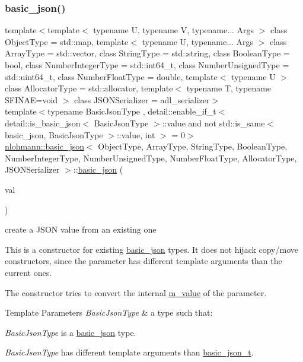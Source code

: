 \subsubsection{\texorpdfstring{basic\+\_\+json()}{basic\_json()}\hspace{0.1cm}{\footnotesize\ttfamily [4/9]}}
{\footnotesize\ttfamily template$<$template$<$ typename U, typename V, typename... Args $>$ class Object\+Type = std\+::map, template$<$ typename U, typename... Args $>$ class Array\+Type = std\+::vector, class String\+Type  = std\+::string, class Boolean\+Type  = bool, class Number\+Integer\+Type  = std\+::int64\+\_\+t, class Number\+Unsigned\+Type  = std\+::uint64\+\_\+t, class Number\+Float\+Type  = double, template$<$ typename U $>$ class Allocator\+Type = std\+::allocator, template$<$ typename T, typename S\+F\+I\+N\+A\+E=void $>$ class J\+S\+O\+N\+Serializer = adl\+\_\+serializer$>$ \\
template$<$typename Basic\+Json\+Type , detail\+::enable\+\_\+if\+\_\+t$<$ detail\+::is\+\_\+basic\+\_\+json$<$ Basic\+Json\+Type $>$\+::value and not std\+::is\+\_\+same$<$ basic\+\_\+json, Basic\+Json\+Type $>$\+::value, int $>$  = 0$>$ \\
\mbox{\hyperlink{classnlohmann_1_1basic__json}{nlohmann\+::basic\+\_\+json}}$<$ Object\+Type, Array\+Type, String\+Type, Boolean\+Type, Number\+Integer\+Type, Number\+Unsigned\+Type, Number\+Float\+Type, Allocator\+Type, J\+S\+O\+N\+Serializer $>$\+::\mbox{\hyperlink{classnlohmann_1_1basic__json}{basic\+\_\+json}} (\begin{DoxyParamCaption}\item[{const Basic\+Json\+Type \&}]{val }\end{DoxyParamCaption})\hspace{0.3cm}{\ttfamily [inline]}}



create a J\+S\+ON value from an existing one 

This is a constructor for existing \mbox{\hyperlink{classnlohmann_1_1basic__json}{basic\+\_\+json}} types. It does not hijack copy/move constructors, since the parameter has different template arguments than the current ones.

The constructor tries to convert the internal \mbox{\hyperlink{classnlohmann_1_1basic__json_aeb0814f76966f99290cb29e127c90a77}{m\+\_\+value}} of the parameter.


\begin{DoxyTemplParams}{Template Parameters}
{\em Basic\+Json\+Type} & a type such that\+:
\begin{DoxyItemize}
\item {\itshape Basic\+Json\+Type} is a \mbox{\hyperlink{classnlohmann_1_1basic__json}{basic\+\_\+json}} type.
\item {\itshape Basic\+Json\+Type} has different template arguments than \mbox{\hyperlink{classnlohmann_1_1basic__json_afff7860310ae69f29f8158a77ec0ef13}{basic\+\_\+json\+\_\+t}}.
\end{DoxyItemize}\\
\hline
\end{DoxyTemplParams}


